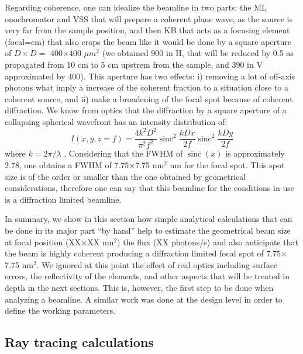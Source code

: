 \documentclass{iucr}              %
\newcommand{\inred}[1]{{\color{red}#1}}
\DeclareMathOperator{\sinc}{sinc}
\begin{document}
Regarding coherence, one can idealize the beamline in two parts: the ML onochromator and VSS that will prepare a coherent plane wave, as the source is very far from the sample position, and then KB that acts as a focusing element (focal=cm) that also crops the beam like it would be done by a square aperture of $D \times D=$ 400$\times$400 $\mu m^2$ \inred{(we obtained 900 in H, that will be reduced by 0.5 as propagated from 10 cm to 5 cm upstrem from the sample, and 390 in V approximated by 400)}. This aperture has two effects: i) removing a lot of off-axis photons what imply a increase of the coherent fraction to a situation close to a coherent source, and ii) make a broadening of the focal spot because of coherent diffraction. We know from optics that the diffraction by a square aperture of a collapsing spherical wavefront has an intensity distribution of:
\begin{equation}
 I(x,y,z=f) = \frac{4 k^2 D^2}{\pi^2 f^2} \sinc^2\frac{k D x}{2 f} \sinc^2\frac{k D y}{2 f}
\end{equation}
where $k=2\pi/\lambda$ . Considering that the FWHM of $\sinc(x)$ is approximately 2.78, one obtains a FWHM of 7.75$\times$7.75 nm$^2$ nm for the focal spot. This spot size is of the order or smaller than the one obtained by geometrical considerations, therefore one can say that this beamline for the conditions in use is a diffraction limited beamline. 


In summary, we show in this section how simple analytical calculations that can be done in its major part ``by hand'' help to estimate the geometrical beam size at focal position (XX$\times$XX nm$^2$) the flux (XX photons/s) and also anticipate that the beam is highly coherent producing a diffraction limited focal spot of  7.75$\times$7.75 nm$^2$. We ignored at this point the effect of real optics including surface errors, the reflectivity of the elements, and other aspects that will be treated in depth in the next sections. This is, however, the first step to be done when analyzing a beamline. A similar work was done at the design level in order to define the working parameters.   




\subsection{Ray tracing calculations}
\label{level1}
\end{document}
